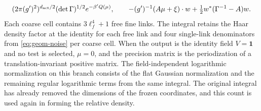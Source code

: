 \documentclass[11pt,a4paper]{article}
\numberwithin{equation}{section}
\begin{document}
\begin{equation}
 (2\pi(g')^2)^{d_{\rm act}/2}(\det\Gamma)^{1/2} e^{-\beta' Q(\mu)},
 \qquad
 - (g')^{-1}(A\mu+\xi)\cdot w+\tfrac12 w^*(\Gamma^{-1}-A)w .
 \label{eq:geom-affine}
\end{equation}
Each coarse cell contains \(3\ell_f^4+1\) free fine links. The integral retains the Haar density factor at the identity for each free link and four single-link denominators from \eqref{eq:geom-noise} per coarse cell. When the output is the identity field \(V=\mathbf 1\) and no test is selected, \(\mu=0\), and the precision matrix is the periodization of a translation-invariant positive matrix. The field-independent logarithmic normalization on this branch consists of the flat Gaussian normalization and the remaining regular logarithmic terms from the same integral. The original integral has already removed the dimensions of the frozen coordinates, and this count is used again in forming the relative density.
\end{document}
